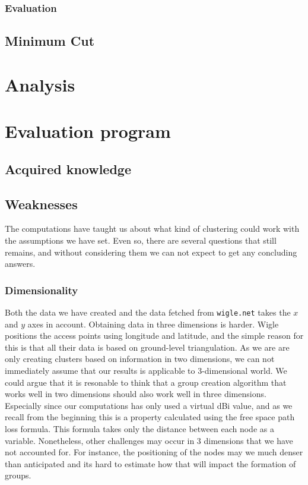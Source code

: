 \subsubsection{Evaluation}

\subsection{Minimum Cut}

\section{Analysis}
\section{Evaluation program}

\subsection{Acquired knowledge}
\subsection{Weaknesses}
The computations have taught us about what kind of clustering could work with the assumptions we have set. Even so, there are several questions that still remains,
and without considering them we can not expect to get any concluding answers. 

\subsubsection{Dimensionality} 
Both the data we have created and the data fetched from \verb|wigle.net| takes the $x$ and $y$ axes in account. Obtaining data in three dimensions is harder.
Wigle positions the access points using longitude and latitude, and the simple reason for this is that all their data is based on ground-level triangulation.
As we are are only creating clusters based on information in two dimensions, we can not immediately assume that our results is applicable to 3-dimensional world. 
We could argue that it is resonable to think that a group creation algorithm that works well in two dimensions should also work well in three dimensions. Especially since our computations has only
used a virtual dBi value, and as we recall from the beginning this is a property calculated using the free space path loss formula. This formula takes only the distance between each node
as a variable. Nonetheless, other challenges may occur in 3 dimensions that we have not accounted for. For instance, 
the positioning of the nodes may we much denser than anticipated and its hard to estimate how that will impact the formation of groups. 

